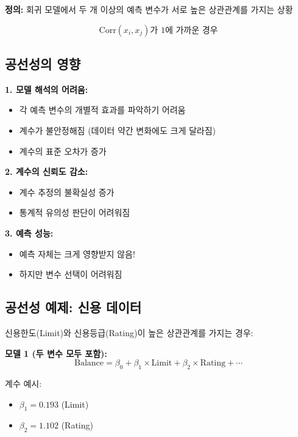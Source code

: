 \documentclass[12pt]{article}
\begin{document}
\textbf{정의:} 회귀 모델에서 두 개 이상의 예측 변수가 서로 높은 상관관계를 가지는 상황

\begin{equation}
\text{Corr}(x_i, x_j) \text{가 1에 가까운 경우}
\end{equation}

\subsection{공선성의 영향}

\textbf{1. 모델 해석의 어려움:}
\begin{itemize}
    \item 각 예측 변수의 개별적 효과를 파악하기 어려움
    \item 계수가 불안정해짐 (데이터 약간 변화에도 크게 달라짐)
    \item 계수의 표준 오차가 증가
\end{itemize}

\textbf{2. 계수의 신뢰도 감소:}
\begin{itemize}
    \item 계수 추정의 불확실성 증가
    \item 통계적 유의성 판단이 어려워짐
\end{itemize}

\textbf{3. 예측 성능:}
\begin{itemize}
    \item 예측 자체는 크게 영향받지 않음!
    \item 하지만 변수 선택이 어려워짐
\end{itemize}

\subsection{공선성 예제: 신용 데이터}

신용한도(Limit)와 신용등급(Rating)이 높은 상관관계를 가지는 경우:

\textbf{모델 1 (두 변수 모두 포함):}
\begin{equation}
\text{Balance} = \beta_0 + \beta_1 \times \text{Limit} + \beta_2 \times \text{Rating} + \cdots
\end{equation}

계수 예시:
\begin{itemize}
    \item $\beta_1 = 0.193$ (Limit)
    \item $\beta_2 = 1.102$ (Rating)
\end{itemize}
\end{document}

